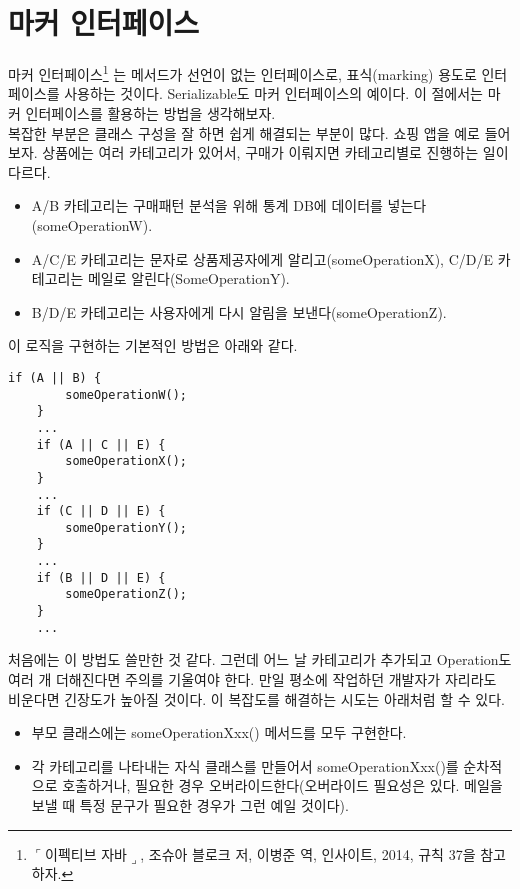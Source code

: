 \section{마커 인터페이스}
마커 인터페이스\footnote{$\ulcorner$이펙티브 자바$\lrcorner$, 조슈아 블로크 저, 이병준 역, 인사이트, 2014, 규칙 37을 참고하자.}
는 메서드가 선언이 없는 인터페이스로, 표식(marking) 용도로 인터페이스를 사용하는 것이다. 
Serializable도 마커 인터페이스의 예이다. 이 절에서는 마커 인터페이스를 활용하는 방법을 생각해보자.\\

복잡한 부분은 클래스 구성을 잘 하면 쉽게 해결되는 부분이 많다.
쇼핑 앱을 예로 들어보자. 상품에는 여러 카테고리가 있어서, 구매가 이뤄지면 카테고리별로 진행하는 일이 다르다.
\begin{itemize}
\item A/B 카테고리는 구매패턴 분석을 위해 통계 DB에 데이터를 넣는다(someOperationW).
\item A/C/E 카테고리는 문자로 상품제공자에게 알리고(someOperationX), C/D/E 카테고리는 메일로 알린다(SomeOperationY).
\item B/D/E 카테고리는 사용자에게 다시 알림을 보낸다(someOperationZ).
\end{itemize}

이 로직을 구현하는 기본적인 방법은 아래와 같다.
\begin{lstlisting}[frame=single]
	if (A || B) { 
		someOperationW(); 
	}
	...
	if (A || C || E) { 
		someOperationX(); 
	}
	...
	if (C || D || E) { 
		someOperationY(); 
	} 
	...
	if (B || D || E) { 
		someOperationZ(); 
	}
	...
\end{lstlisting}
처음에는 이 방법도 쓸만한 것 같다.
그런데 어느 날 카테고리가 추가되고 Operation도 여러 개 더해진다면 주의를 기울여야 한다.
만일 평소에 작업하던 개발자가 자리라도 비운다면 긴장도가 높아질 것이다. 
이 복잡도를 해결하는 시도는 아래처럼 할 수 있다.
\begin{itemize}
\item 부모 클래스에는 someOperationXxx() 메서드를 모두 구현한다.
\item 각 카테고리를 나타내는 자식 클래스를 만들어서 someOperationXxx()를 순차적으로 호출하거나, 필요한 경우 오버라이드한다(오버라이드 필요성은 있다. 메일을 보낼 때 특정 문구가 필요한 경우가 그런 예일 것이다).
\end{itemize}

